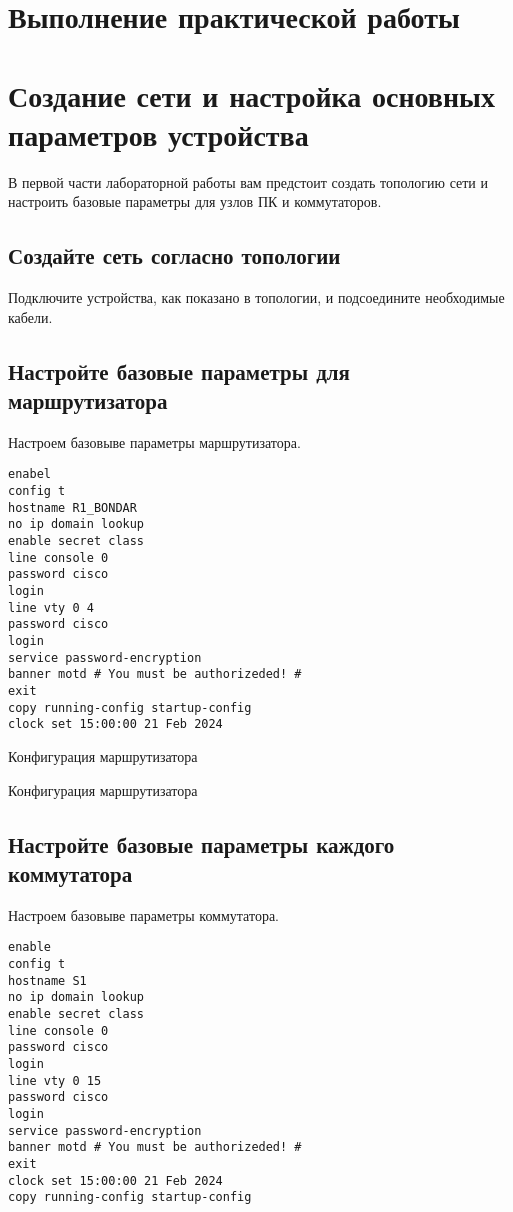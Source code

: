 \section{Выполнение практической работы}


\section{Создание сети и настройка основных параметров устройства}

В первой части лабораторной работы вам предстоит создать топологию сети и настроить базовые
параметры для узлов ПК и коммутаторов.

\subsection{Создайте сеть согласно топологии}
Подключите устройства, как показано в топологии, и подсоедините необходимые кабели.

\subsection{Настройте базовые параметры для маршрутизатора}
Настроем базовыве параметры маршрутизатора.

\begin{lstlisting}
enabel
config t
hostname R1_BONDAR
no ip domain lookup
enable secret class
line console 0
password cisco
login
line vty 0 4
password cisco
login
service password-encryption
banner motd # You must be authorizeded! #
exit
copy running-config startup-config
clock set 15:00:00 21 Feb 2024
\end{lstlisting}

\begin{image}
	\caption{Конфигурация маршрутизатора}
	\label{fig:switch:router:0}
\end{image}

\begin{image}
	\caption{Конфигурация маршрутизатора}
	\label{fig:switch:router:1}
\end{image}

\subsection{Настройте базовые параметры каждого коммутатора}
Настроем базовыве параметры коммутатора.

\begin{lstlisting}
enable
config t
hostname S1
no ip domain lookup
enable secret class
line console 0
password cisco
login
line vty 0 15
password cisco
login
service password-encryption
banner motd # You must be authorizeded! #
exit
clock set 15:00:00 21 Feb 2024
copy running-config startup-config
\end{lstlisting}

